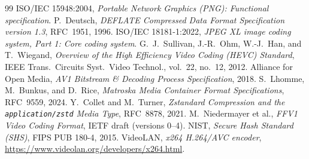 \documentclass[11pt,a4paper]{article}
\begin{document}
\begin{thebibliography}{99}
 ISO/IEC 15948:2004, \textit{Portable Network Graphics (PNG):
Functional specification}.
 P.~Deutsch, \textit{DEFLATE Compressed Data Format
Specification version 1.3}, RFC~1951, 1996.
 ISO/IEC 18181-1:2022, \textit{JPEG XL image coding system,
Part 1: Core coding system}.
 G.~J.~Sullivan, J.-R.~Ohm, W.-J.~Han, and T.~Wiegand,
\textit{Overview of the High Efficiency Video Coding (HEVC) Standard},
IEEE Trans.\ Circuits Syst.\ Video Technol., vol.~22, no.~12, 2012.
 Alliance for Open Media, \textit{AV1 Bitstream \& Decoding
Process Specification}, 2018.
 S.~Lhomme, M.~Bunkus, and D.~Rice, \textit{Matroska Media
Container Format Specifications}, RFC~9559, 2024.
 Y.~Collet and M.~Turner, \textit{Zstandard Compression and the
\texttt{application/zstd} Media Type}, RFC~8878, 2021.
 M.~Niedermayer et al., \textit{FFV1 Video Coding Format},
IETF draft (versions 0--4).
 NIST, \textit{Secure Hash Standard (SHS)}, FIPS PUB 180-4, 2015.
 VideoLAN, \textit{x264 H.264/AVC encoder},
\url{https://www.videolan.org/developers/x264.html}.
\end{thebibliography}
\end{document}
